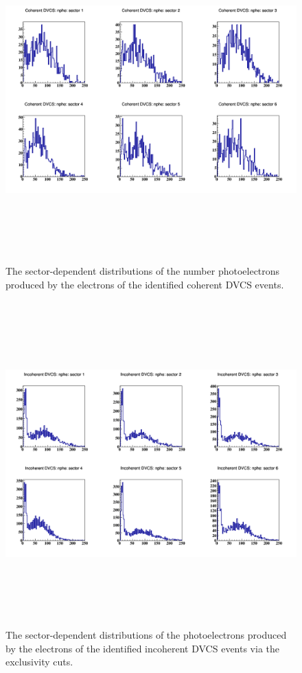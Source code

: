 \begin{figure}[h!]
   \hspace{-1.0 cm}
\includegraphics[height=12.5cm]{fig/e_nphe_coh.png}
\caption{The sector-dependent distributions of the number photoelectrons 
produced by the electrons of the identified coherent DVCS events. }
\label{fig:nphe_after_excl_cuts_coh}
\end{figure}

\begin{figure}[h!]
   \hspace{-1.0 cm}
   \includegraphics[height=12.5cm]{fig/e_nphe_incoh.png}
\caption{The sector-dependent distributions of the photoelectrons produced by 
the electrons of the identified incoherent DVCS events via the exclusivity 
cuts.  }
\label{fig:nphe_after_excl_cuts_incoh}
\end{figure}


